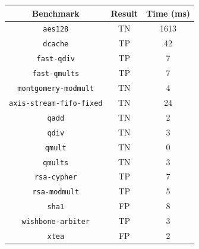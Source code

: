 \begin{tabular}{ccc}
    \toprule
    \textbf{Benchmark} & \textbf{Result} & \textbf{Time (ms)} \\
    \midrule
    \texttt{aes128} & TN & 1613 \\
    \texttt{dcache} & TP & 42\\
    \texttt{fast-qdiv} & TP & 7 \\
    \texttt{fast-qmults} & TP & 7 \\
    \texttt{montgomery-modmult} & TN & 4 \\
    \texttt{axis-stream-fifo-fixed} & TN & 24 \\
    \texttt{qadd} & TN & 2 \\
    \texttt{qdiv} & TN & 3 \\
    \texttt{qmult} & TN & 0 \\
    \texttt{qmults} & TN & 3 \\
    \texttt{rsa-cypher} & TP & 7 \\
    \texttt{rsa-modmult} & TP & 5 \\
    \texttt{sha1} & FP & 8 \\
    \texttt{wishbone-arbiter} & TP & 3 \\
    \texttt{xtea} & FP & 2 \\
    \bottomrule
\end{tabular}
